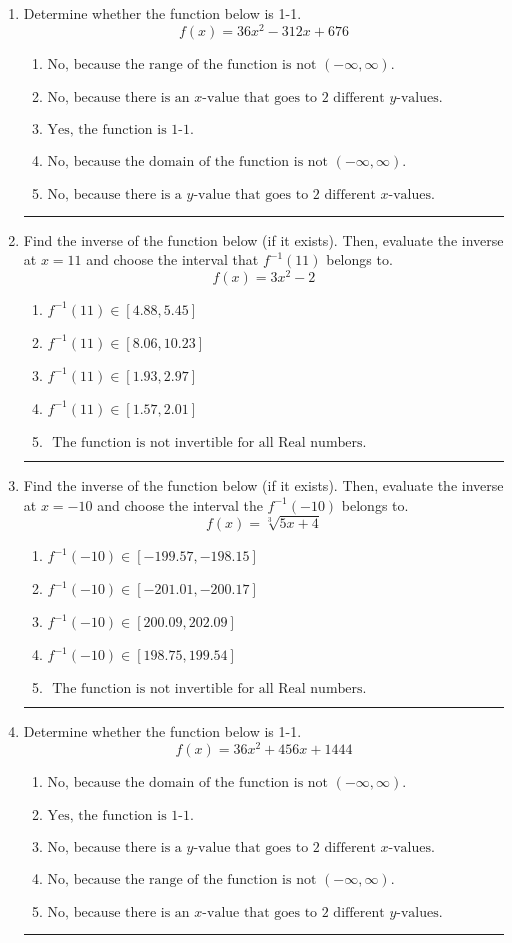 \documentclass[14pt]{extbook}
\newcommand{\litem}[1]{\item#1\hspace*{-1cm}\rule{\textwidth}{0.4pt}}
\begin{document}
\begin{enumerate}
{\begin{enumerate}[label=\Alph*.]
\end{enumerate} }
\litem{
Determine whether the function below is 1-1.\[ f(x) = 36 x^2 - 312 x + 676 \]\begin{enumerate}[label=\Alph*.]
\item \( \text{No, because the range of the function is not $(-\infty, \infty)$.} \)
\item \( \text{No, because there is an $x$-value that goes to 2 different $y$-values.} \)
\item \( \text{Yes, the function is 1-1.} \)
\item \( \text{No, because the domain of the function is not $(-\infty, \infty)$.} \)
\item \( \text{No, because there is a $y$-value that goes to 2 different $x$-values.} \)

\end{enumerate} }
\litem{
Find the inverse of the function below (if it exists). Then, evaluate the inverse at $x = 11$ and choose the interval that $f^{-1}(11)$ belongs to.\[ f(x) = 3 x^2 - 2 \]\begin{enumerate}[label=\Alph*.]
\item \( f^{-1}(11) \in [4.88, 5.45] \)
\item \( f^{-1}(11) \in [8.06, 10.23] \)
\item \( f^{-1}(11) \in [1.93, 2.97] \)
\item \( f^{-1}(11) \in [1.57, 2.01] \)
\item \( \text{ The function is not invertible for all Real numbers. } \)

\end{enumerate} }
\litem{
Find the inverse of the function below (if it exists). Then, evaluate the inverse at $x = -10$ and choose the interval the $f^{-1}(-10)$ belongs to.\[ f(x) = \sqrt[3]{5 x + 4} \]\begin{enumerate}[label=\Alph*.]
\item \( f^{-1}(-10) \in [-199.57, -198.15] \)
\item \( f^{-1}(-10) \in [-201.01, -200.17] \)
\item \( f^{-1}(-10) \in [200.09, 202.09] \)
\item \( f^{-1}(-10) \in [198.75, 199.54] \)
\item \( \text{ The function is not invertible for all Real numbers. } \)

\end{enumerate} }
\litem{
Determine whether the function below is 1-1.\[ f(x) = 36 x^2 + 456 x + 1444 \]\begin{enumerate}[label=\Alph*.]
\item \( \text{No, because the domain of the function is not $(-\infty, \infty)$.} \)
\item \( \text{Yes, the function is 1-1.} \)
\item \( \text{No, because there is a $y$-value that goes to 2 different $x$-values.} \)
\item \( \text{No, because the range of the function is not $(-\infty, \infty)$.} \)
\item \( \text{No, because there is an $x$-value that goes to 2 different $y$-values.} \)


\end{enumerate}}
\end{enumerate}
\end{document}
